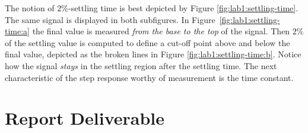%
The notion of \(2\%\)-settling time is best depicted by Figure
\ref{fig:lab1:settling-time}. The same signal is displayed in both subfigures.
In Figure~\ref{fig:lab1:settling-time:a} the final value is
measured \emph{from the base to the top} of the signal. Then \(2\%\) of the
settling value is computed to define a cut-off point above and below the final
value, depicted as the broken lines in Figure
\ref{fig:lab1:settling-time:b}. Notice how the signal \emph{stays} in the
settling region after the settling time.
%
The next characteristic of the step response worthy of measurement is the
time constant.

\section{Report Deliverable}

